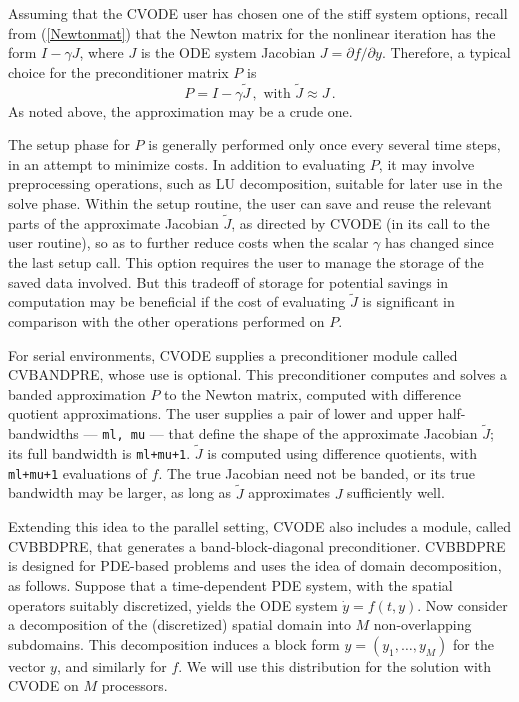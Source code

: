 Assuming that the CVODE user has chosen one of the stiff system
options, recall from (\ref{Newtonmat}) that the Newton matrix for
the nonlinear iteration has the form $I - \gamma J$, where $J$ is the
ODE system Jacobian $J = \partial f / \partial y$.  Therefore, a
typical choice for the preconditioner matrix $P$ is
\begin{equation*}
  P = I - \gamma \tilde{J} \, , \mbox{ with } \tilde{J} \approx J \, .
\end{equation*}
As noted above, the approximation may be a crude one.

The setup phase for $P$ is generally performed only once every several
time steps, in an attempt to minimize costs.  In addition to
evaluating $P$, it may involve preprocessing operations, such as LU
decomposition, suitable for later use in the solve phase.  Within the
setup routine, the user can save and reuse the relevant parts of the
approximate Jacobian $\tilde{J}$, as directed by CVODE (in its call to
the user routine), so as to further reduce costs when the scalar
$\gamma$ has changed since the last setup call.  This option requires the
user to manage the storage of the saved data involved.  But this
tradeoff of storage for potential savings in computation may be
beneficial if the cost of evaluating $\tilde{J}$ is significant in
comparison with the other operations performed on $P$.

For serial environments, CVODE supplies a preconditioner module
called CVBANDPRE, whose use is optional.  This preconditioner
computes and solves a
banded approximation $P$ to the Newton matrix, computed with
difference quotient approximations.  The user supplies a pair of lower
and upper half-bandwidths --- {\tt ml, mu} --- that define the shape of
the approximate Jacobian $\tilde{J}$; its full bandwidth is
{\tt ml+mu+1}.  $\tilde{J}$ is computed using difference quotients,
with {\tt ml+mu+1} evaluations of $f$.  The true Jacobian need not be
banded, or its true bandwidth may be larger, as long as $\tilde{J}$
approximates $J$ sufficiently well.

Extending this idea to the parallel setting, CVODE also includes a
module, called CVBBDPRE, that generates a band-block-diagonal
preconditioner.  CVBBDPRE is designed for PDE-based problems and uses the
idea of domain decomposition, as follows.  Suppose that a
time-dependent PDE system, with the spatial operators suitably
discretized, yields the ODE system $\dot{y} = f(t,y)$.  Now consider a
decomposition of the (discretized) spatial domain into $M$
non-overlapping subdomains.  This decomposition induces a block form
$y = (y_1,\ldots,y_M)$ for the vector $y$, and similarly for $f$.  We
will use this distribution for the solution with CVODE on $M$
processors.

